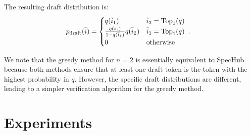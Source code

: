 \documentclass{article}
\makeatletter
\newcommand{\crvspace}{\@ifstar\crvspacestar\crvspacenostar}
\newcommand{\crvspacenostar}[1]{}
\newcommand{\crvspacestar}[1]{}
\makeatother
\begin{document}
The resulting draft distribution is:
\crvspace{-3pt}
\begin{equation}
p_{\operatorname{draft}}(\bar{i})=\begin{cases}
q(\bar{i}_1)&\bar{i}_2=\operatorname{Top}_1(q)\\
\frac{q(\bar{i}_1)}{1-q(\bar{i}_1)}q(\bar{i}_2)&\bar{i}_1=\operatorname{Top}_1(q)\\
0&\text{otherwise}\end{cases}
~.
\end{equation}
\par\crvspace{-3pt}
We note that the greedy method for $n=2$ is essentially equivalent to SpecHub because both methods ensure that at least one draft token is the token with the highest probability in $q$. However, the specific draft distributions are different, leading to a simpler verification algorithm for the greedy method. \section{Experiments}\label{se:experiments}
\end{document}
